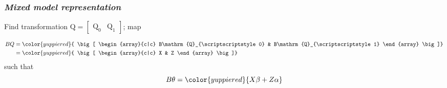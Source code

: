 \documentclass[12pt]{beamer}
\newcommand{\newmaththought}[1]{{ \color{foreground} {#1}}}
\newcommand{\mixedmodelmath}[1]{{ \color{yuppiered} {#1}}}
\newcommand{\ms}{\scriptscriptstyle}
\begin{document}
\begin{frame}
\frametitle{\emph{Mixed model representation}}

Find transformation $\mathrm{Q} = \left[\begin{array}{c|c} \mathrm{Q}_0 & \mathrm{Q}_1 \end{array}\right]$; map

\begin{align*}
BQ &=\mixedmodelmath{ \big[ \begin{array}{c|c} B\mathrm{Q}_{\ms 0} &  B\mathrm{Q}_{\ms 1} \end{array}  \big]}	\\	
&=  \mixedmodelmath{ \big[ \begin{array}{c|c} X & Z \end{array}  \big]}\\
\end{align*}
\noindent
such that
\begin{equation*}
B\theta = \mixedmodelmath{X\beta + Z\alpha}
\end{equation*}

\end{frame}
\end{document}
